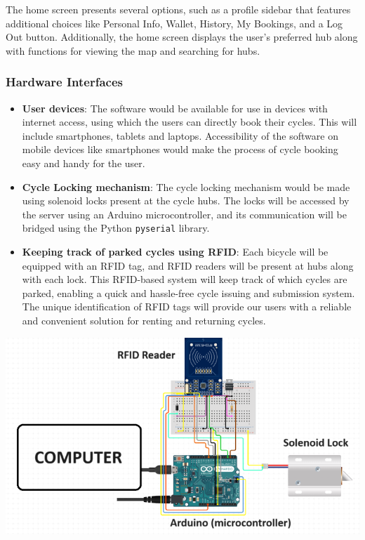 \documentclass[11pt]{article}
\begin{document}
The home screen presents several options, such as a profile sidebar that features additional choices like Personal Info, Wallet, History, My Bookings, and a Log Out button. Additionally, the home screen displays the user's preferred hub along with functions for viewing the map and searching for hubs.
\subsubsection{Hardware Interfaces}
\begin{itemize}
    \item \textbf{User devices}: The software would be available for use in devices with internet access, using which the users can directly book their cycles. This will include smartphones, tablets and laptops. Accessibility of the software on mobile devices like smartphones would make the process of cycle booking easy and handy for the user.
    \item \textbf{Cycle Locking mechanism}: The cycle locking mechanism would be made using solenoid locks present at the cycle hubs. The locks will be accessed by the server using an Arduino microcontroller, and its communication will be bridged using the Python \texttt{pyserial} library.
    \item \textbf{Keeping track of parked cycles using RFID}: Each bicycle will be equipped with an RFID tag, and RFID readers will be present at hubs along with each lock. This RFID-based system will keep track of which cycles are parked, enabling a quick and hassle-free cycle issuing and submission system. The unique identification of RFID tags will provide our users with a reliable and convenient solution for renting and returning cycles.
\end{itemize}
\begin{center}
    \includegraphics*[scale=0.75]{rfid-img.png}
\end{center}
\end{document}
